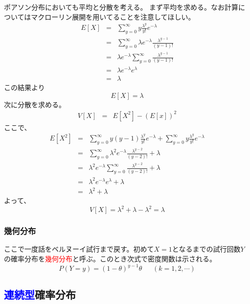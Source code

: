 \documentclass[a4paper,10pt]{jarticle}
\begin{document}
ポアソン分布においても平均と分散を考える。
まず平均を求める。なお計算についてはマクローリン展開を用いてることを注意してほしい。
\begin{eqnarray*}
    E[X] &=& \sum_{y=0}^\infty y\frac{\lambda^y}{y!}e^{-\lambda}\\
        &=&\sum_{y=0}^\infty \lambda e^{-\lambda}\frac{\lambda^{y-1}}{(y-1)!}\\
        &=& \lambda e^{-\lambda}\sum_{y=0}^\infty \frac{\lambda^{y-1}}{(y-1)!}\\
        &=& \lambda e^{-\lambda}e^{\lambda}\\
        &=& \lambda
\end{eqnarray*}
この結果より
\begin{equation}
    E[X] = \lambda \tag{3,11}
\end{equation}
次に分散を求める。
\begin{eqnarray*}
    V[X] &=& E[X^2]-(E[x])^2
\end{eqnarray*}
ここで、
\begin{eqnarray*}
    E[X^2] &=& \sum_{y=0}^\infty y(y-1)\frac{\lambda^y}{y!}e^{-\lambda}+\sum_{y=0}^\infty y\frac{\lambda^y}{y!}e^{-\lambda}\\
        &=&\sum_{y=0}^\infty \lambda^2 e^{-\lambda}\frac{\lambda^{y-2}}{(y-2)!}+\lambda\\
        &=& \lambda^2 e^{-\lambda}\sum_{y=0}^\infty \frac{\lambda^{y-2}}{(y-2)!}+\lambda\\
        &=& \lambda^2 e^{-\lambda}e^{\lambda}+\lambda\\
        &=& \lambda^2+\lambda
\end{eqnarray*}
よって、
\begin{equation}
    V[X]  = \lambda^2+\lambda-\lambda^2=\lambda\tag{3,12}
\end{equation}

\subsubsection{幾何分布}
ここで一度話をベルヌーイ試行まで戻す。初めて$X=1$となるまでの試行回数$Y$の確率分布を\textcolor{red}{幾何分布}と呼ぶ。このとき次式で密度関数は示される。
\begin{equation}
    P(Y=y) = (1-\theta)^{y-1}\theta\ \ \ \ \ \ \ (k=1,2,\cdots)\tag{3,13}
\end{equation}
\subsection{\textcolor{blue}{連続型}確率分布}
\end{document}
